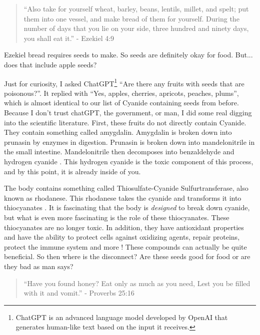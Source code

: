 \documentclass[9.5pt]{article}
\begin{document}
\begin{multicols}{2}
\begin{quotation}
``Also take for yourself wheat, barley, beans, lentils, millet, and spelt; put them into one vessel, and make bread of them for yourself. During the number of days that you lie on your side, three hundred and ninety days, you shall eat it.'' - Ezekiel 4:9
\end{quotation}

Ezekiel bread requires seeds to make. So seeds are definitely okay for food. But... does that include apple seeds?

Just for curiosity, I asked ChatGPT\footnote{ChatGPT is an advanced language model developed by OpenAI that generates human-like text based on the input it receives.} ``Are there any fruits with seeds that are poisonous?”. It replied with “Yes, apples, cherries, apricots, peaches, plums”, which is almost identical to our list of Cyanide containing seeds from before. Because I don't trust chatGPT, the government, or man, I did some real digging into the scientific literature. First, these fruits do not directly contain Cyanide. They contain something called amygdalin. Amygdalin is broken down into prunasin by enzymes in digestion. Prunasin is broken down into mandelonitrile in the small intestine. Mandelonitrile then decomposes into benzaldehyde and hydrogen cyanide \cite{Amygdalin}. This hydrogen cyanide is the toxic component of this process, and by this point, it is already inside of you.

The body contains something called Thiosulfate-Cyanide Sulfurtransferase, also known as rhodanese. This rhodanese takes the cyanide and transforms it into thiocyanates \cite{Thiosulfate-Cyanide Sulfurtransferase, Rhodanese}. It is fascinating that the body is \textit{designed} to break down cyanide, but what is even more fascinating is the role of these thiocyanates. These thiocyanates are no longer toxic. In addition, they have antioxidant properties and have the ability to protect cells against oxidizing agents, repair proteins, protect the immune system and more \cite{Thiocyanate}! These compounds can actually be quite beneficial. So then where is the disconnect? Are these seeds good for food or are they bad as man says?

\begin{quotation}
``Have you found honey? Eat only as much as you need, Lest you be filled with it and vomit.'' - Proverbs 25:16
\end{quotation}


\end{multicols}
\end{document}
